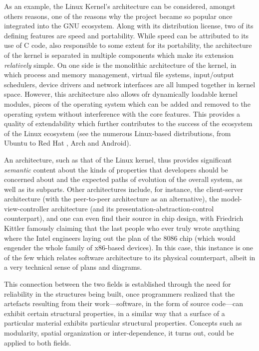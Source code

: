 As an example, the Linux Kernel's architecture can be considered, amongst others reasons, one of the reasons why the project became so popular once integrated into the GNU ecosystem. Along with its distribution license, two of its defining features are speed and portability. While speed can be attributed to its use of C code, also responsible to some extent for its portability, the architecture of the kernel is separated in multiple components which make its extension \emph{relatively} simple. On one side is the monolithic architecture of the kernel, in which process and memory management, virtual file systems, input/output schedulers, device drivers and network interfaces are all lumped together in kernel space. However, this architecture also allows ofr dynamically loadable kernel modules, pieces of the operating system which can be added and removed to the operating system without interference with the core features. This provides a quality of extendability which further contributes to the success of the ecosystem of the Linux ecosystem (see the numerous Linux-based distributions, from Ubuntu to Red Hat , Arch and Android).

An architecture, such as that of the Linux kernel, thus provides significant \emph{semantic} content about the kinds of properties that developers should be concerned about and the expected paths of evolution of the overall system, as well as its subparts. Other architectures include, for instance, the client-server architecture (with the peer-to-peer architecture as an alternative), the model-view-controller architecture (and its presentation-abstraction-control counterpart), and one can even find their source in chip design, with Friedrich Kittler famously claiming that the last people who ever truly wrote anything where the Intel engineers laying out the plan of the 8086 chip (which would engender the whole family of x86-based devices)\cite{kittler_there_1997}. In this case, this instance is one of the few which relates software architecture to its physical counterpart, albeit in a very technical sense of plans and diagrams.

This connection between the two fields is established through the need for reliability in the structures being built, once programmers realized that the artefacts resulting from their work—software, in the form of source code—can exhibit certain structural properties, in a similar way that a surface of a particular material exhibits particular structural properties. Concepts such as modularity, spatial organization or inter-dependence, it turns out, could be applied to both fields.

